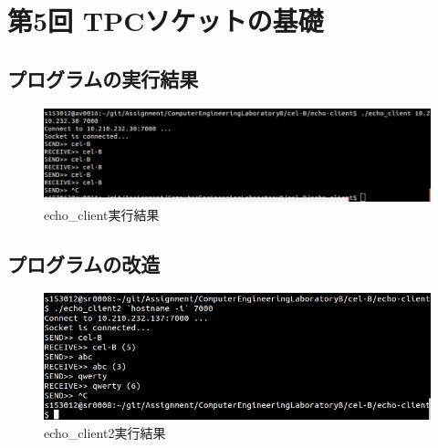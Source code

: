 \documentclass[a4j]{celb-report}
\begin{document}

%

\newpage
\section{第5回 TPCソケットの基礎}
\subsection{プログラムの実行結果}
\begin{figure}[htb]
 \centering
 \includegraphics[width=15cm]{../echo-client/echo_client_output.png}
 \caption{echo\_client実行結果} \label{EchoClientOutput}
\end{figure}
\subsection{プログラムの改造}
\begin{figure}[htb]
 \centering
 \includegraphics[width=15cm]{../echo-client/echo_client2_output.png}
 \caption{echo\_client2実行結果} \label{EchoClient2Output}
\end{figure}
\end{document}
